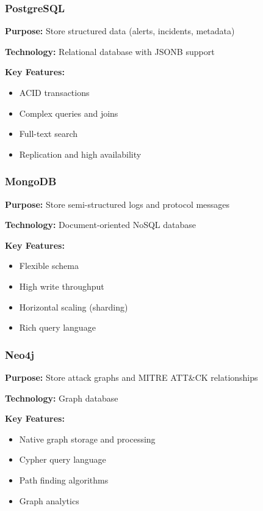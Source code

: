 \documentclass[12pt,a4paper]{article}
\begin{document}
\subsubsection{PostgreSQL}

\textbf{Purpose:} Store structured data (alerts, incidents, metadata)

\textbf{Technology:} Relational database with JSONB support

\textbf{Key Features:}
\begin{itemize}[leftmargin=1cm,itemsep=0pt]
    \item ACID transactions
    \item Complex queries and joins
    \item Full-text search
    \item Replication and high availability
\end{itemize}

\subsubsection{MongoDB}

\textbf{Purpose:} Store semi-structured logs and protocol messages

\textbf{Technology:} Document-oriented NoSQL database

\textbf{Key Features:}
\begin{itemize}[leftmargin=1cm,itemsep=0pt]
    \item Flexible schema
    \item High write throughput
    \item Horizontal scaling (sharding)
    \item Rich query language
\end{itemize}

\subsubsection{Neo4j}

\textbf{Purpose:} Store attack graphs and MITRE ATT\&CK relationships

\textbf{Technology:} Graph database

\textbf{Key Features:}
\begin{itemize}[leftmargin=1cm,itemsep=0pt]
    \item Native graph storage and processing
    \item Cypher query language
    \item Path finding algorithms
    \item Graph analytics
\end{itemize}
\end{document}
